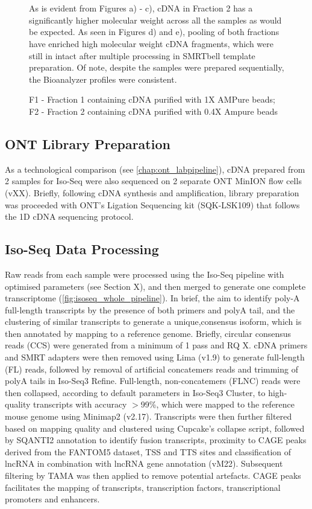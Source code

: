 \begin{figure}[!htp]
{	\\
	\\	 	
	As is evident from Figures a) - c), cDNA in Fraction 2 has a significantly higher molecular weight across all the samples as would be expected. As seen in Figures d) and e), pooling of both fractions have enriched high molecular weight cDNA fragments, which were still in intact after multiple processing in SMRTbell template preparation. Of note, despite the samples were prepared sequentially, the Bioanalyzer profiles were consistent. 
	
	F1 - Fraction 1 containing cDNA purified with 1X AMPure beads; F2 - Fraction 2 containing cDNA purified with 0.4X Ampure beads
 }
	\label{fig:isoseq_whole_bioresults}
\end{figure}

\subsection{ONT Library Preparation}
As a technological comparison (see \cref{chap:ont_labpipeline}), cDNA prepared from 2 samples for Iso-Seq were also sequenced on 2 separate ONT MinION flow cells (vXX). Briefly, following cDNA synthesis and amplification, library preparation was proceeded with ONT's Ligation Sequencing kit (SQK-LSK109) that follows the 1D cDNA sequencing protocol. 


\subsection{Iso-Seq Data Processing}
Raw reads from each sample were processed using the Iso-Seq pipeline with optimised parameters (see Section X), and then merged to generate one complete transcriptome (\cref{fig:isoseq_whole_pipeline}). In brief, the aim to identify poly-A full-length transcripts by the presence of both primers and polyA tail, and the clustering of similar transcripts to generate a unique,consensus isoform, which is then annotated by mapping to a reference genome. Briefly, circular consensus reads (CCS) were generated from a minimum of 1 pass and RQ X. cDNA primers and SMRT adapters were then removed using Lima (v1.9) to generate full-length (FL) reads, followed by removal of artificial concatemers reads and trimming of polyA tails in Iso-Seq3 Refine. Full-length, non-concatemers (FLNC) reads were then collapsed, according to default parameters in Iso-Seq3 Cluster, to high-quality transcripts with accuracy $>$99\%, which were mapped to the reference mouse genome using Minimap2 (v2.17). Transcripts were then further filtered based on mapping quality and clustered using Cupcake's collapse script, followed by SQANTI2 annotation to identify fusion transcripts, proximity to CAGE peaks derived from the FANTOM5 dataset, TSS and TTS sites and classification of lncRNA in combination with lncRNA gene annotation (vM22).  Subsequent filtering by TAMA was then applied to remove potential artefacts. CAGE peaks facilitates the mapping of transcripts, transcription factors, transcriptional promoters and enhancers.

